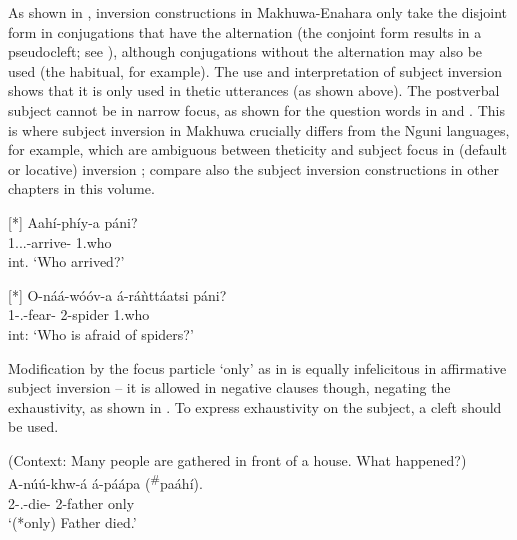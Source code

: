 \documentclass[output=paper]{langscibook}
\begin{document}
\z

As shown in \citet{vanderWal2012a}, inversion constructions in Makhuwa-Enahara only take the disjoint form in conjugations that have the alternation (the conjoint form results in a pseudocleft; see ), although conjugations without the alternation may also be used (the habitual, for example). The use and interpretation of subject inversion shows that it is only used in thetic utterances (as shown above). The postverbal subject cannot be in narrow focus, as shown for the question words in  and . This is where subject inversion in Makhuwa crucially differs from the Nguni languages, for example, which are ambiguous between theticity and subject focus in (default or locative) inversion \citep[e.g.][]{Buell2005,Zerbian2006}; compare also the subject inversion constructions in other chapters in this volume.

\ea
[*]{
\label{bkm:Ref95375798}
\gll
Aahí-phíy-a  páni?\\
1\SM{}.\PST{}.\PFV{}.\DJ{}-arrive-\FV{}  1.who\\
\glt
int. ‘Who arrived?’ \citep[196]{vanderWal2009a}\\
}

\z

\ea
[*]{
\label{bkm:Ref95375801}
\gll
O-náá-wóóv-a  á-ráǹttáatsi  páni? \\
1\SM{}-\PRS{}.\DJ{}-fear-\FV{}  2-spider  1.who\\
\glt
int: ‘Who is afraid of spiders?’ \citep[221]{vanderWal2012a}\\
}

\z


Modification by the focus particle ‘only’ as in  is equally infelicitous in affirmative subject inversion – it is allowed in negative clauses though, negating the exhaustivity, as shown in . To express exhaustivity on the subject, a cleft should be used.
\largerpage[-1]
\pagebreak

\ea
\label{bkm:Ref110092014}
(Context: Many people are gathered in front of a house. What happened?)\\
\gll
A-núú-khw-á  á-páápa  (\textsuperscript{\#}paáhí).\\
2\SM{}-\PFV{}.\PERS{}-die-\FV{}  2-father   {\db}only\\
\glt
‘(*only) Father died.’\\
\end{document}
